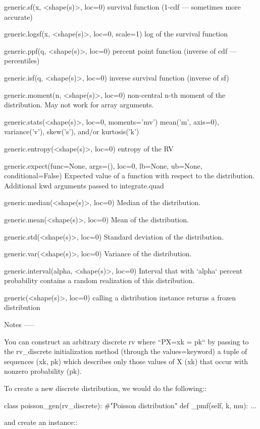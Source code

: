 \begin{DoxyVerb}
generic.sf(x, <shape(s)>, loc=0)
    survival function (1-cdf --- sometimes more accurate)

generic.logsf(x, <shape(s)>, loc=0, scale=1)
    log of the survival function

generic.ppf(q, <shape(s)>, loc=0)
    percent point function (inverse of cdf --- percentiles)

generic.isf(q, <shape(s)>, loc=0)
    inverse survival function (inverse of sf)

generic.moment(n, <shape(s)>, loc=0)
    non-central n-th moment of the distribution.  May not work for array
    arguments.

generic.stats(<shape(s)>, loc=0, moments='mv')
    mean('m', axis=0), variance('v'), skew('s'), and/or kurtosis('k')

generic.entropy(<shape(s)>, loc=0)
    entropy of the RV

generic.expect(func=None, args=(), loc=0, lb=None, ub=None,
        conditional=False)
    Expected value of a function with respect to the distribution.
    Additional kwd arguments passed to integrate.quad

generic.median(<shape(s)>, loc=0)
    Median of the distribution.

generic.mean(<shape(s)>, loc=0)
    Mean of the distribution.

generic.std(<shape(s)>, loc=0)
    Standard deviation of the distribution.

generic.var(<shape(s)>, loc=0)
    Variance of the distribution.

generic.interval(alpha, <shape(s)>, loc=0)
    Interval that with `alpha` percent probability contains a random
    realization of this distribution.

generic(<shape(s)>, loc=0)
    calling a distribution instance returns a frozen distribution

Notes
-----

You can construct an arbitrary discrete rv where ``P{X=xk} = pk``
by passing to the rv_discrete initialization method (through the
values=keyword) a tuple of sequences (xk, pk) which describes only those
values of X (xk) that occur with nonzero probability (pk).

To create a new discrete distribution, we would do the following::

    class poisson_gen(rv_discrete):
        #"Poisson distribution"
        def _pmf(self, k, mu):
            ...

and create an instance::


\end{DoxyVerb}
